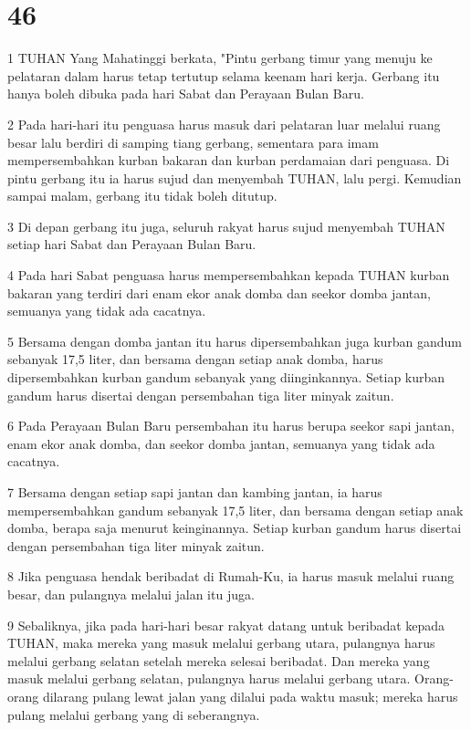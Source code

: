 \chapter{46}

\par 1 TUHAN Yang Mahatinggi berkata, "Pintu gerbang timur yang menuju ke pelataran dalam harus tetap tertutup selama keenam hari kerja. Gerbang itu hanya boleh dibuka pada hari Sabat dan Perayaan Bulan Baru.
\par 2 Pada hari-hari itu penguasa harus masuk dari pelataran luar melalui ruang besar lalu berdiri di samping tiang gerbang, sementara para imam mempersembahkan kurban bakaran dan kurban perdamaian dari penguasa. Di pintu gerbang itu ia harus sujud dan menyembah TUHAN, lalu pergi. Kemudian sampai malam, gerbang itu tidak boleh ditutup.
\par 3 Di depan gerbang itu juga, seluruh rakyat harus sujud menyembah TUHAN setiap hari Sabat dan Perayaan Bulan Baru.
\par 4 Pada hari Sabat penguasa harus mempersembahkan kepada TUHAN kurban bakaran yang terdiri dari enam ekor anak domba dan seekor domba jantan, semuanya yang tidak ada cacatnya.
\par 5 Bersama dengan domba jantan itu harus dipersembahkan juga kurban gandum sebanyak 17,5 liter, dan bersama dengan setiap anak domba, harus dipersembahkan kurban gandum sebanyak yang diinginkannya. Setiap kurban gandum harus disertai dengan persembahan tiga liter minyak zaitun.
\par 6 Pada Perayaan Bulan Baru persembahan itu harus berupa seekor sapi jantan, enam ekor anak domba, dan seekor domba jantan, semuanya yang tidak ada cacatnya.
\par 7 Bersama dengan setiap sapi jantan dan kambing jantan, ia harus mempersembahkan gandum sebanyak 17,5 liter, dan bersama dengan setiap anak domba, berapa saja menurut keinginannya. Setiap kurban gandum harus disertai dengan persembahan tiga liter minyak zaitun.
\par 8 Jika penguasa hendak beribadat di Rumah-Ku, ia harus masuk melalui ruang besar, dan pulangnya melalui jalan itu juga.
\par 9 Sebaliknya, jika pada hari-hari besar rakyat datang untuk beribadat kepada TUHAN, maka mereka yang masuk melalui gerbang utara, pulangnya harus melalui gerbang selatan setelah mereka selesai beribadat. Dan mereka yang masuk melalui gerbang selatan, pulangnya harus melalui gerbang utara. Orang-orang dilarang pulang lewat jalan yang dilalui pada waktu masuk; mereka harus pulang melalui gerbang yang di seberangnya.
